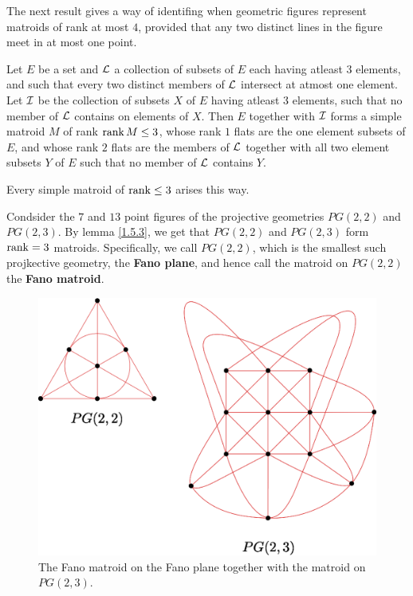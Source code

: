 The next result gives a way of identifing when geometric figures represent
matroids of rank at most $4$, provided that any two distinct lines in the
figure meet in at most one point.

\begin{lemma}\label{1.5.4}
    Let $E$ be a set and $\mathcal{L}$ a collection of subsets of $E$ each having
    atleast $3$ elements, and such that every two distinct members of $\mathcal{L}$
    intersect at atmost one element. Let  $\mathcal{I}$ be the collection of subsets $X$
    of  $E$ having atleast  $3$ elements, such that no member of  $\mathcal{L}$ contains
    on elements of  $X$. Then $E$ together with $\mathcal{I}$ forms a simple matroid $M$
    of rank  $\operatorname{rank}{M} \leq 3$, whose rank $1$ flats are the one element subsets
    of  $E$, and whose rank $2$ flats are the members of $\mathcal{L}$ together with all
    two element subsets $Y$ of $E$ such that no member of $\mathcal{L}$ contains $Y$.
\end{lemma}
\begin{corollary}
    Every simple matroid of $\operatorname{rank} \leq 3$ arises this way.
\end{corollary}

\begin{example}\label{1.19}
    Condsider the $7$ and  $13$ point figures of the projective geometries
    $PG(2,2)$ and $PG(2,3)$. By lemma \ref{1.5.3}, we get that $PG(2,2)$ and
    $PG(2,3)$ form $\operatorname{rank}=3$  matroids. Specifically, we call $PG(2,2)$, which is
    the smallest such projkective geometry, the \textbf{Fano plane}, and hence
    call the matroid on $PG(2,2)$ the \textbf{Fano matroid}.
    \begin{figure}[h]
        \centering
        \includegraphics[scale=0.7]{Figures/Chapter1/pg(2,2)_pg(2,3).eps}
        \caption{The Fano matroid on the Fano plane together with the matroid on
        $PG(2,3)$.}
        \label{fig_1.14}
    \end{figure}
\end{example}


